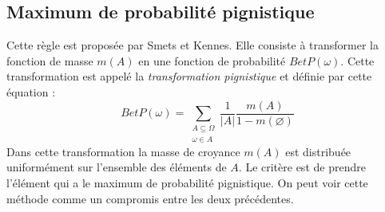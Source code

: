 \subsection{Maximum de probabilité pignistique}

Cette règle est proposée par Smets et Kennes. Elle consiste à transformer la fonction
de masse $m(A)$ en une fonction de probabilité $BetP(\omega)$. Cette transformation
est appelé la \emph{transformation pignistique} et définie par cette équation :
\begin{equation}
BetP(\omega) = \sum_{\substack{A \subseteq \Omega \\
\omega \in A}} \frac{1}{|A|}  \frac{m(A)}{1-m(\varnothing)}
\end{equation}
Dans cette transformation la masse de croyance $m(A)$ est distribuée uniformément
sur l’ensemble des éléments de $A$. Le critère est de prendre l'élément qui a le
maximum de probabilité pignistique. On peut voir cette méthode comme un compromis
entre les deux précédentes.